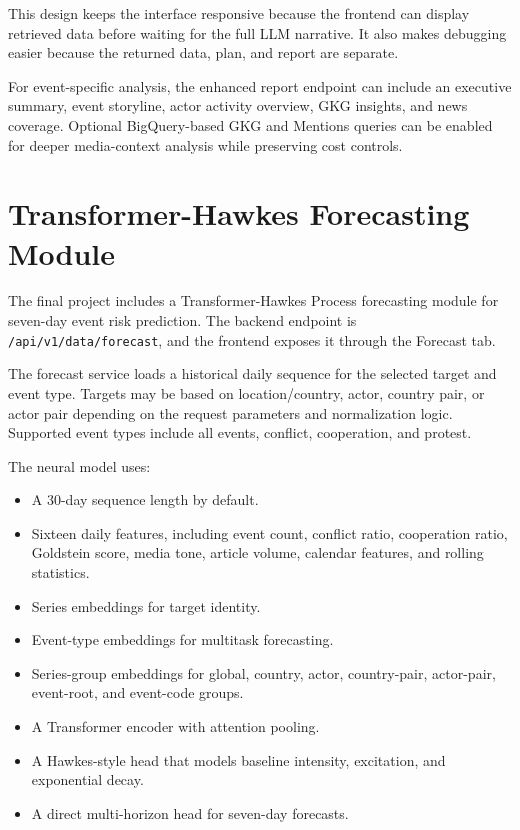 \documentclass[11pt]{article}
\begin{document}
This design keeps the interface responsive because the frontend can display retrieved data before waiting for the full LLM narrative. It also makes debugging easier because the returned data, plan, and report are separate.

For event-specific analysis, the enhanced report endpoint can include an executive summary, event storyline, actor activity overview, GKG insights, and news coverage. Optional BigQuery-based GKG and Mentions queries can be enabled for deeper media-context analysis while preserving cost controls.

\section{Transformer-Hawkes Forecasting Module}

The final project includes a Transformer-Hawkes Process forecasting module for seven-day event risk prediction. The backend endpoint is \texttt{/api/v1/data/forecast}, and the frontend exposes it through the Forecast tab.

The forecast service loads a historical daily sequence for the selected target and event type. Targets may be based on location/country, actor, country pair, or actor pair depending on the request parameters and normalization logic. Supported event types include all events, conflict, cooperation, and protest.

The neural model uses:

\begin{itemize}
    \item A 30-day sequence length by default.
    \item Sixteen daily features, including event count, conflict ratio, cooperation ratio, Goldstein score, media tone, article volume, calendar features, and rolling statistics.
    \item Series embeddings for target identity.
    \item Event-type embeddings for multitask forecasting.
    \item Series-group embeddings for global, country, actor, country-pair, actor-pair, event-root, and event-code groups.
    \item A Transformer encoder with attention pooling.
    \item A Hawkes-style head that models baseline intensity, excitation, and exponential decay.
    \item A direct multi-horizon head for seven-day forecasts.
\end{itemize}
\end{document}
